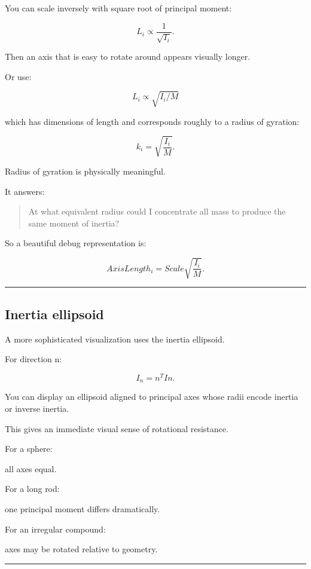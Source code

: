 You can scale inversely with square root of principal moment:

\[
L_i
\propto
\frac1{\sqrt{I_i}}.
\]

Then an axis that is easy to rotate around appears visually longer.

Or use:

\[
L_i\propto\sqrt{I_i/M}
\]

which has dimensions of length and corresponds roughly to a radius of gyration:

\[
\boxed{
k_i
=
\sqrt{\frac{I_i}{M}}.
}
\]

Radius of gyration is physically meaningful.

It answers:

\begin{quote}
At what equivalent radius could I concentrate all mass to produce the same moment of inertia?
\end{quote}

So a beautiful debug representation is:

\[
AxisLength_i
=
Scale
\sqrt{\frac{I_i}{M}}.
\]

\begin{center}\rule{0.5\linewidth}{0.5pt}\end{center}

\subsection{Inertia ellipsoid}\label{06-engine-ii-ch039-inertia-ellipsoid}

A more sophisticated visualization uses the inertia ellipsoid.

For direction n:

\[
I_n=n^TIn.
\]

You can display an ellipsoid aligned to principal axes whose radii encode inertia or inverse inertia.

This gives an immediate visual sense of rotational resistance.

For a sphere:

all axes equal.

For a long rod:

one principal moment differs dramatically.

For an irregular compound:

axes may be rotated relative to geometry.

\begin{center}\rule{0.5\linewidth}{0.5pt}\end{center}

